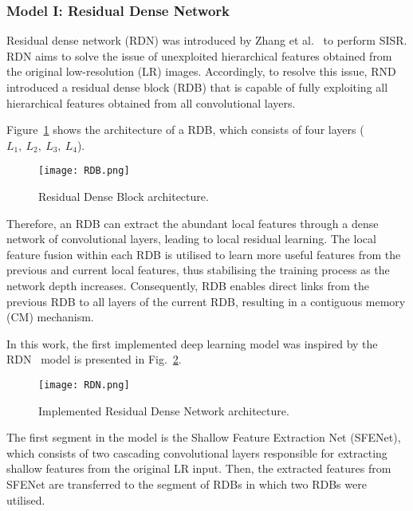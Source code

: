 \subsubsection{Model I: Residual Dense Network}

Residual dense network (RDN) was introduced by Zhang et al.~\cite{Zhang2018} to perform SISR.
RDN aims to solve the issue of unexploited hierarchical features obtained from the original low-resolution (LR) images.
Accordingly, to resolve this issue, RND introduced a residual dense block (RDB) that is capable of fully exploiting all hierarchical features obtained from all convolutional layers.

Figure~\ref{fig:RDB} shows the architecture of a RDB, which consists of four layers (\(L_1,\ L_2,\ L_3,\ L_4\)).
\begin{figure} [h!]
	\begin{center}
		\texttt{[image: RDB.png]}
	\end{center}
	\caption{Residual Dense Block architecture.} 
	\label{fig:RDB}
\end{figure}
Therefore, an RDB can extract the abundant local features through a dense network of convolutional layers, leading to local residual learning.
The local feature fusion within each RDB is utilised to learn more useful features from the previous and current local features, thus stabilising the training process as the network depth increases.
Consequently, RDB enables direct links from the previous RDB to all layers of the current RDB, resulting in a contiguous memory (CM) mechanism.

In this work, the first implemented deep learning model was inspired by the RDN~\cite{Zhang2018} model is presented in Fig.~\ref{fig:RDN}.
\begin{figure} [h!]
	\begin{center}
		\texttt{[image: RDN.png]}
	\end{center}
	\caption{Implemented Residual Dense Network architecture.} 
	\label{fig:RDN}
\end{figure}
The first segment in the model is the Shallow Feature Extraction Net (SFENet), which consists of two cascading convolutional layers responsible for extracting shallow features from the original LR input.
Then, the extracted features from SFENet are transferred to the segment of RDBs in which two RDBs were utilised.

